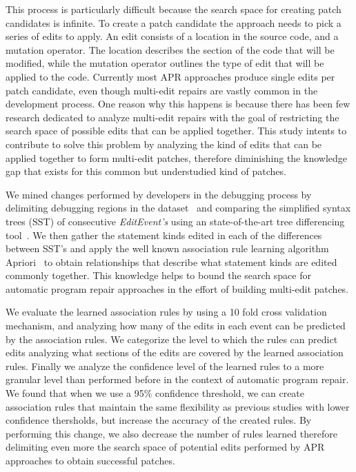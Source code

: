 \documentclass[sigconf]{acmart}
\begin{document}
This process is particularly difficult because the search space
for creating patch candidates is infinite. To create a patch 
candidate the approach needs to pick a series of edits to apply.
An edit consists of a location in the source code,
and a mutation operator. The location describes the section
of the code that will be modified, while the mutation operator
outlines the type of edit that will be applied to the code.
Currently most APR approaches produce single edits per patch
candidate, even though multi-edit repairs are vastly common in the 
development process. One reason why this happens is because
there has been few research dedicated to analyze multi-edit
repairs with the goal of restricting the search space of possible edits that 
can be applied together. This study intents to contribute to
solve this problem by analyzing  
the kind of edits that can be applied together to form
multi-edit patches, therefore diminishing the knowledge
gap that exists for this common but understudied kind of patches.

We mined changes performed by developers in the debugging
process by delimiting debugging regions in the dataset~\cite{msr18challenge} and comparing the simplified syntax
trees (SST) of consecutive \textit{EditEvent's} using an 
state-of-the-art tree differencing tool~\cite{Pawlik16Apted}.
We then gather the statement kinds edited in each of the 
differences between SST's and apply the well known association
rule learning algorithm Apriori~\cite{Agrawal94}
to obtain relationships that describe what statement kinds
are edited commonly together. This knowledge helps to 
bound the search space for automatic program repair approaches
in the effort of building multi-edit patches.

We evaluate the learned association rules by using a 10 fold
cross validation mechanism, and analyzing how many of the edits
in each event can be predicted by the association rules.
We categorize the level to which the rules can predict edits
analyzing what sections of the edits are covered by the 
learned association rules. Finally we analyze
the confidence level of the learned rules to a more granular 
level than performed before in the context of automatic
program repair. We found that when we use a 95\% confidence
threshold, we can create association
rules that maintain the same flexibility as previous
studies with lower confidence thersholds, but increase
the accuracy of the created rules.
By performing this change, we also
decrease the number of rules learned therefore
delimiting even more the search space of potential edits
performed by APR approaches to obtain successful patches.
\end{document}
